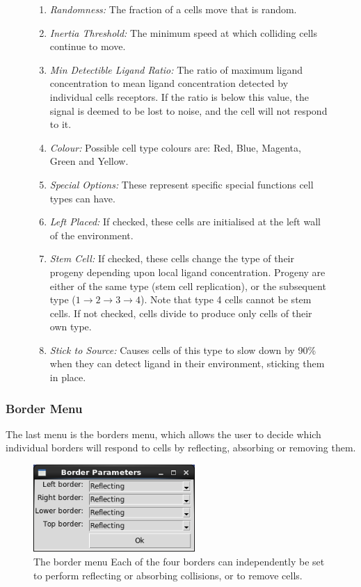 \documentclass[12pt]{article}
\begin{document}
\begin{figure}[H]
{\begin{enumerate}[topsep=2pt,itemsep=-1ex,partopsep=1ex,parsep=1ex]
derived from its last move.
\item {\itshape Randomness:} The fraction of a cells move that is random.
\item {\itshape Inertia Threshold:} The minimum speed at which colliding cells continue to move.
\item {\itshape Min Detectible Ligand Ratio:} The ratio of maximum ligand 
concentration to mean ligand concentration detected by individual cells 
receptors. If the ratio is below this value, the signal is 
deemed to be lost to noise, and the cell will not respond to it.
\item {\itshape Colour:} Possible cell type colours are: Red, Blue, Magenta, Green and 
Yellow.
\item {\itshape Special Options:} These represent specific special 
functions cell types can have.
\item {\itshape Left Placed:} If checked, these cells are initialised at the left wall of the environment.
\item {\itshape Stem Cell:} If checked, these cells change the type of their progeny depending upon local ligand 
concentration. Progeny are either of the same type (stem cell replication), or the subsequent type  
(\(1 \rightarrow 2 \rightarrow 3 \rightarrow 4\)). Note that type 4 cells cannot be stem cells. If not checked,
cells divide to produce only cells of their own type.
\item {\itshape Stick to Source:} Causes cells of this type to slow down by 90\% when they can detect
  ligand in their environment, sticking them in place.
\end{enumerate}
}
\end{figure}

\subsubsection{Border Menu}

The last menu is the borders menu, which allows the user to decide which 
individual borders will respond to cells by reflecting, absorbing or 
removing them.

\begin{figure}[H]
\centering
\includegraphics[width=6.13cm]{media/border_screen.png}
\caption[]{The border menu Each of the four 
borders can independently be set to perform reflecting or absorbing 
collisions, or to remove cells.}
\end{figure}
\end{document}
